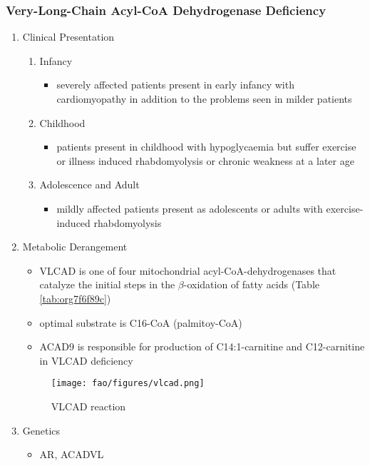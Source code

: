 \documentclass[12pt]{scrartcl}
\begin{document}
\subsubsection{Very-Long-Chain Acyl-CoA Dehydrogenase Deficiency}
\label{sec:org439533d}
\begin{enumerate}
\item Clinical Presentation
\label{sec:orgc1e258c}
\begin{enumerate}
\item Infancy
\label{sec:orgb2114dc}
\begin{itemize}
\item severely affected patients present in early infancy with
cardiomyopathy in addition to the problems seen in milder patients
\end{itemize}
\item Childhood
\label{sec:org3d5d7f6}
\begin{itemize}
\item patients present in childhood with hypoglycaemia but suffer exercise
or illness induced rhabdomyolysis or chronic weakness at a later age
\end{itemize}
\item Adolescence and Adult
\label{sec:org00701a7}
\begin{itemize}
\item mildly affected patients present as adolescents or adults with
exercise-induced rhabdomyolysis
\end{itemize}
\end{enumerate}
\item Metabolic Derangement
\label{sec:org710d78f}
\begin{itemize}
\item VLCAD is one of four mitochondrial acyl-CoA-dehydrogenases that
catalyze the initial steps in the \(\beta\)-oxidation of fatty acids
(Table \ref{tab:org7f6f89c})
\item optimal substrate is C16-CoA (palmitoy-CoA)
\item ACAD9 is responsible for production of C14:1-carnitine and
C12-carnitine in VLCAD deficiency
\end{itemize}
\begin{figure}[htbp]
\centering
\texttt{[image: fao/figures/vlcad.png]}
\caption{\label{fig:org0bfb19a}VLCAD reaction}
\end{figure}

\item Genetics
\label{sec:org8b9d396}
\begin{itemize}
\item AR, ACADVL
\end{itemize}


\end{enumerate}
\end{document}
